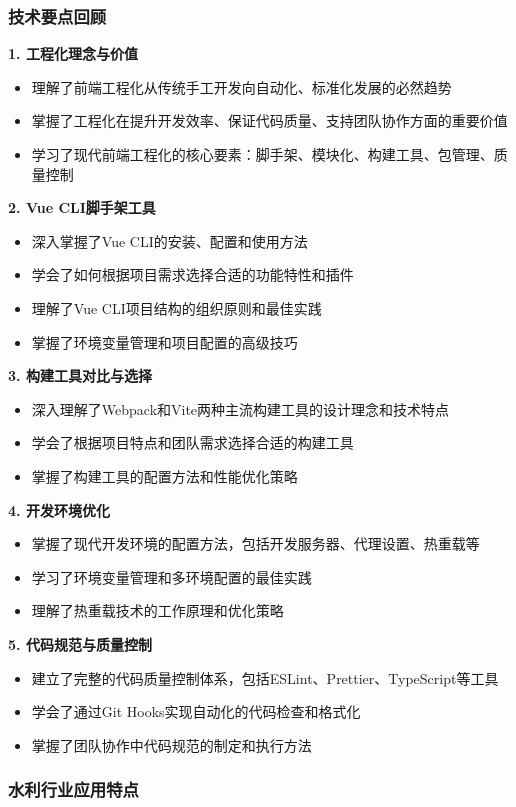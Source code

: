 \subsubsection{技术要点回顾}\label{ux6280ux672fux8981ux70b9ux56deux987e} \textbf{1. 工程化理念与价值} \begin{itemize} \tightlist \item
理解了前端工程化从传统手工开发向自动化、标准化发展的必然趋势 \item 掌握了工程化在提升开发效率、保证代码质量、支持团队协作方面的重要价值 \item 学习了现代前端工程化的核心要素：脚手架、模块化、构建工具、包管理、质量控制
\end{itemize} \textbf{2. Vue CLI脚手架工具} \begin{itemize} \tightlist \item 深入掌握了Vue CLI的安装、配置和使用方法 \item
学会了如何根据项目需求选择合适的功能特性和插件 \item 理解了Vue CLI项目结构的组织原则和最佳实践 \item 掌握了环境变量管理和项目配置的高级技巧 \end{itemize} \textbf{3. 构建工具对比与选择}
\begin{itemize} \tightlist \item 深入理解了Webpack和Vite两种主流构建工具的设计理念和技术特点 \item 学会了根据项目特点和团队需求选择合适的构建工具 \item
掌握了构建工具的配置方法和性能优化策略 \end{itemize} \textbf{4. 开发环境优化} \begin{itemize} \tightlist \item 掌握了现代开发环境的配置方法，包括开发服务器、代理设置、热重载等
\item 学习了环境变量管理和多环境配置的最佳实践 \item 理解了热重载技术的工作原理和优化策略 \end{itemize} \textbf{5. 代码规范与质量控制} \begin{itemize} \tightlist \item
建立了完整的代码质量控制体系，包括ESLint、Prettier、TypeScript等工具 \item 学会了通过Git Hooks实现自动化的代码检查和格式化 \item 掌握了团队协作中代码规范的制定和执行方法
\end{itemize} \subsubsection{水利行业应用特点}\label{ux6c34ux5229ux884cux4e1aux5e94ux7528ux7279ux70b9}
